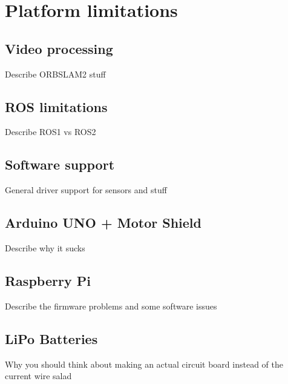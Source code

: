\chapter{Platform limitations}\label{cha:PlatformLimits}


\section{Video processing}
Describe ORBSLAM2 stuff

\section{ROS limitations}
Describe ROS1 vs ROS2

\section{Software support}
General driver support for sensors and stuff

\section{Arduino UNO + Motor Shield}
Describe why it sucks

\section{Raspberry Pi}
Describe the firmware problems and some software issues

\section{LiPo Batteries}
Why you should think about making an actual circuit board instead of the current wire salad
